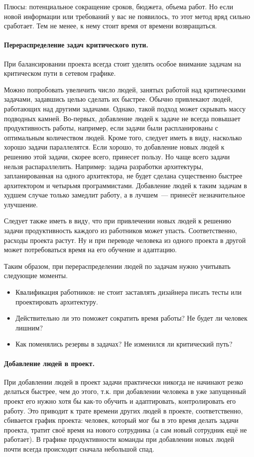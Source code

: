 \documentclass{../../text-style}
\begin{document}
Плюсы: потенциальное сокращение сроков, бюджета, объема работ. Но если новой информации или требований у вас не появилось, то этот метод вряд сильно сработает. Тем не менее, к нему стоит время от времени возвращаться.

\paragraph{Перераспределение задач критического пути.} При балансировании проекта всегда стоит уделять особое внимание задачам на критическом пути в сетевом графике.

Можно попробовать увеличить число людей, занятых работой над критическими задачами, задавшись целью сделать их быстрее. Обычно привлекают людей, работающих над другими задачами. Однако, такой подход может скрывать массу подводных камней. Во-первых, добавление людей к задаче не всегда повышает продуктивность работы, например, если задачи были распланированы с оптимальным количеством людей. Кроме того, следует иметь в виду, насколько хорошо задачи параллелятся. Если хорошо, то добавление новых людей к решению этой задачи, скорее всего, принесет пользу. Но чаще всего задачи нельзя распараллелить. Например: задача разработки архитектуры, запланированная на одного архитектора, не будет сделана существенно быстрее архитектором и четырьмя программистами. Добавление людей к таким задачам в худшем случае только замедлит работу, а в лучшем~--- принесёт незначительное улучшение.

Следует также иметь в виду, что при привлечении новых людей к решению задачи продуктивность каждого из работников может упасть. Соответственно, расходы проекта растут. Ну и при переводе человека из одного проекта в другой может потребоваться время на его обучение и адаптацию.

Таким образом, при перераспределении людей по задачам нужно учитывать следующие моменты.

\begin{itemize}
    \item Квалификация работников: не стоит заставлять дизайнера писать тесты или проектировать архитектуру.
    \item Действительно ли это поможет сократить время работы? Не будет ли человек лишним? 
    \item Как поменялись резервы в задачах? Не изменился ли критический путь?
\end{itemize}

\paragraph{Добавление людей в проект.} При добавлении людей в проект задачи практически никогда не начинают резко делаться быстрее, чем до этого, т.к. при добавлении человека в уже запущенный проект его нужно хотя бы как-то обучить и адаптировать, контролировать его работу. Это приводит к трате времени других людей в проекте, соответственно, сбивается график проекта: человек, который мог бы в это время делать задачи проекта, тратит своё время на нового сотрудника (а сам новый сотрудник ещё не работает). В графике продуктивности команды при добавлении новых людей почти всегда происходит сначала небольшой спад.
\end{document}
